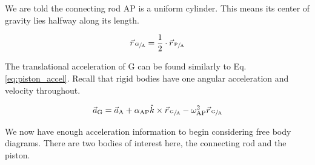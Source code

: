 \documentclass[nofoot,pdf-a,balance,colorlinks,upint,subscriptcorrection,varvw,mathalfa=cal=boondoxo]{asmeconf}
\begin{document}
    We are told the connecting rod AP is a uniform cylinder. This means its center of gravity lies halfway along its length.

    \begin{equation}
        \vec{r}_{\,\sfrac{\textrm{G}}{\textrm{A}}} = \frac{1}{2}\cdot \vec{r}_{\,\sfrac{\textrm{P}}{\textrm{A}}}
    \end{equation}

    The translational acceleration of G can be found similarly to Eq. \eqref{eq:piston_accel}. Recall that rigid bodies have one angular acceleration and velocity throughout.

    \begin{equation}
        \vec{a}_{\textrm{G}} = \vec{a}_{\textrm{A}} + \alpha_{\textrm{AP}}\hat{k} \times \vec{r}_{\,\sfrac{\textrm{G}}{\textrm{A}}} - \omega_{\textrm{AP}}^2 \vec{r}_{\,\sfrac{\textrm{G}}{\textrm{A}}}
    \end{equation}

    

    We now have enough acceleration information to begin considering free body diagrams. There are two bodies of interest here, the connecting rod and the piston.



\end{document}
